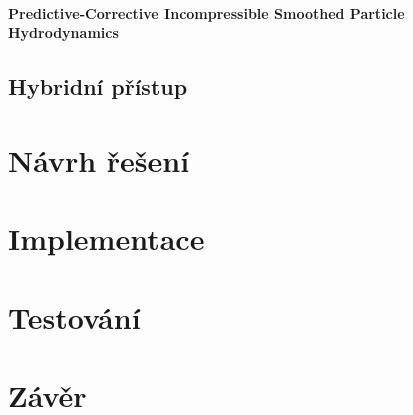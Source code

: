 \subsubsection{Predictive-Corrective Incompressible Smoothed Particle Hydrodynamics}
\section{Hybridní přístup}




\chapter{Návrh řešení}
\label{chapter:navrh_resení}

\chapter{Implementace}
\label{chapter:implementace}

\chapter{Testování}
\label{chapter:testovani}

\chapter{Závěr}
\label{chapter:zaver}





